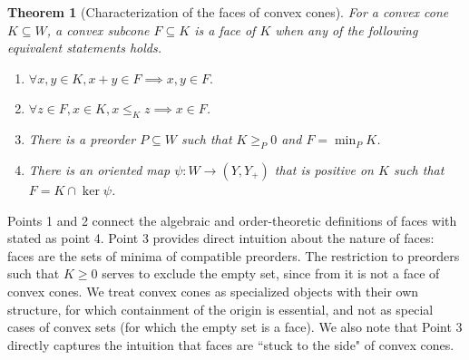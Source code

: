 \documentclass{article}
\theoremstyle{plain}
\newtheorem{theorem}{Theorem}[section]
\theoremstyle{definition}
\theoremstyle{remark}
\begin{document}
\begin{theorem}[Characterization of the faces of convex cones]
\label{loc:characterization_of_the_faces_of_convex_cones.statement}
For a convex cone $K \subseteq W$, a convex subcone $F \subseteq K$ is a face of $K$
when any of the following equivalent statements holds.
\begin{enumerate}
\item $\forall x, y \in K,  x + y \in F \implies x, y \in F.$
\item $\forall z \in F,  x \in K,  x \le_{K} z \implies x \in F$.
\item There is a preorder $P \subseteq W$ such that $K \ge_{P} 0$ and $F = \min_{P} K$.
\item There is an oriented map $\psi:W \to (Y, Y_+)$ that is positive on $K$ such that $F = K \cap \ker \psi$.
\end{enumerate}
\end{theorem}
Points 1 and 2 connect the algebraic and order-theoretic definitions of faces with  stated as point 4. Point 3 provides direct intuition about the nature of faces: faces are the sets of minima of compatible preorders. The restriction to preorders such that $K \geq 0$ serves to exclude the empty set, since from  it is not a face of convex cones. We treat convex cones as specialized objects with their own structure, for which containment of the origin is essential, and not as special cases of convex sets (for which the empty set is a face).
We also note that Point 3 directly captures the intuition that faces are ``stuck to the side" of convex cones.
\end{document}
